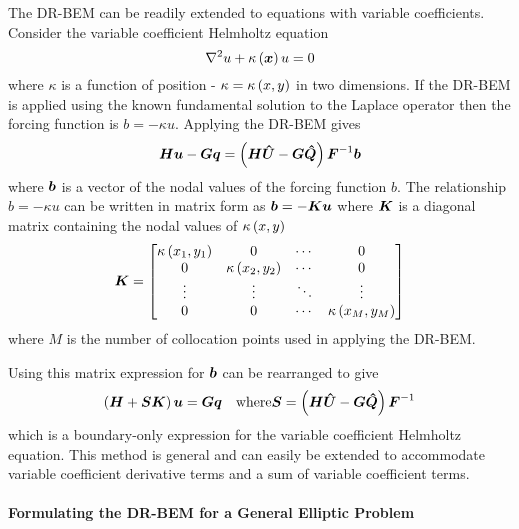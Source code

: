 The DR-BEM can be readily extended to equations with variable coefficients.
Consider the variable coefficient Helmholtz equation
\begin{equation}
  \laplacian{u} + \fnof{\kappa}{\vect{x}} u = 0
\end{equation}
where $\kappa$ is a function of position - $\kappa =  \kappa\left( x,y \right) $ in
two dimensions.  If the DR-BEM is applied using the known fundamental solution
to the Laplace operator then the forcing function is $b = -\kappa u$.
Applying the DR-BEM gives
\begin{equation}
  \matr{H} \vect{u} - \matr{G} \vect{q} = \pbrac{\matr{H} \matr{\hat{U}} -
    \matr{G} \matr{\hat{Q}}} \matr{F}^{-1} \vect{b}
  \label{eq:vcb}
\end{equation}
where $\vect{b}$ is a vector of the nodal values of the forcing function
$b$.  The relationship $b = -\kappa u$ can be written in matrix form as
$\vect{b} = - \matr{K} \vect{u}$ where $\matr{K}$ is a diagonal matrix
containing the nodal values of $ \kappa\left( x,y \right) $ \ie
\begin{equation}
  \matr{K} =  \begin{bmatrix} \fnof{\kappa}{x_{1},y_{1}} & 0 &
      \cdots & 0 \\ 0 & \fnof{\kappa}{x_{2},y_{2}} & \cdots & 0 \\ \vdots &
      \vdots & \ddots & \vdots \\ 0 & 0 & \cdots & \fnof{\kappa}{x_{M},y_{M}} 
\end{bmatrix}
\end{equation}
where $M$ is the number of collocation points used in applying the DR-BEM.

Using this matrix expression for $\vect{b}$  can be rearranged
to give
\begin{equation}
  \pbrac{\matr{H} + \matr{S} \matr{K}} \vect{u} = \matr{G}
  \vect{q}\quad\text{where}\matr{S} = \pbrac{\matr{H} \matr{\hat{U}} -
    \matr{G} \matr{\hat{Q}}} \matr{F}^{-1}
\end{equation}
which is a boundary-only expression for the variable coefficient Helmholtz
equation.  This method is general and can easily be extended to accommodate
variable coefficient derivative terms and a sum of variable coefficient
terms. 

\paragraph{Formulating the DR-BEM for a General Elliptic Problem}
\label{sec:genform}

